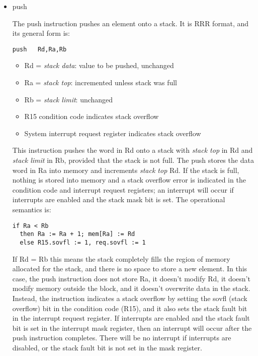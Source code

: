 \documentclass[11pt]{article}
\begin{document}
\begin{itemize}
\item push
\label{sec:org155ed21}

The push instruction pushes an element onto a stack.  It is RRR
format, and its general form is:

\begin{verbatim}
push   Rd,Ra,Rb
\end{verbatim}

\begin{itemize}
\item Rd = \emph{stack data}: value to be pushed, unchanged
\item Ra = \emph{stack top}: incremented unless stack was full
\item Rb = \emph{stack limit}: unchanged
\item R15 condition code indicates stack overflow
\item System interrupt request register indicates stack overflow
\end{itemize}

This instruction pushes the word in Rd onto a stack with \emph{stack top}
in Rd and \emph{stack limit} in Rb, provided that the stack is not full.
The push stores the data word in Ra into memory and increments \emph{stack
top} Rd.  If the stack is full, nothing is stored into memory and a stack
overflow error is indicated in the condition code and interrupt
request registers; an interrupt will occur if interrupts are enabled
and the stack mask bit is set.  The operational semantics is:

\begin{verbatim}
if Ra < Rb
  then Ra := Ra + 1; mem[Ra] := Rd
  else R15.sovfl := 1, req.sovfl := 1
\end{verbatim}

If Rd = Rb this means the stack completely fills the region of memory
allocated for the stack, and there is no space to store a new element.
In this case, the push instruction does not store Ra, it doesn't
modify Rd, it doesn't modify memory outside the block, and it doesn't
overwrite data in the stack.  Instead, the instruction indicates a
stack overflow by setting the sovfl (stack overflow) bit in the
condition code (R15), and it also sets the stack fault bit in the
interrupt request register.  If interrupts are enabled and the stack
fault bit is set in the interrupt mask register, then an interrupt
will occur after the push instruction completes.  There will be no
interrupt if interrupts are disabled, or the stack fault bit is not
set in the mask register.


\end{itemize}
\end{document}
